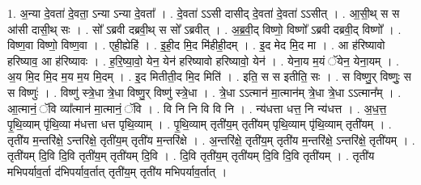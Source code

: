 \documentclass[17pt]{extarticle}
\begin{document}
1. अ॒न्या दे॒वता॑ दे॒वता॒ ऽन्या ऽन्या दे॒वता᳚ । . दे॒वता॑ ऽऽसी दासीद् दे॒वता॑ दे॒वता॑ ऽऽसीत् । . आ॒सी॒थ् स स आ॑सी दासी॒थ् सः । . सो᳚ ऽब्रवी दब्रवी॒थ् स सो᳚ ऽब्रवीत् । . अ॒ब्र॒वी॒द् विष्णो॒ विष्णो᳚ ऽब्रवी दब्रवी॒द् विष्णो᳚ । . विष्ण॒वा विष्णो॒ विष्ण॒वा । . एही॒ह्येहि॑ । . इ॒ही॒द मि॒द मि॑हीही॒दम् । . इ॒द मेद मि॒द मा । . आ ह॑रिष्यावो हरिष्याव॒ आ ह॑रिष्यावः । . ह॒रि॒ष्या॒वो॒ येन॒ येन॑ हरिष्यावो हरिष्यावो॒ येन॑ । . येना॒य म॒यं ॅयेन॒ येना॒यम् । . अ॒य मि॒द मि॒द म॒य म॒य मि॒दम् । . इ॒द मितीती॒द मि॒द मिति॑ । . इति॒ स स इतीति॒ सः । . स विष्णु॒र् विष्णुः॒ स स विष्णुः॑ । . विष्णु॑ स्त्रे॒धा त्रे॒धा विष्णु॒र् विष्णु॑ स्त्रे॒धा । . त्रे॒धा ऽऽत्मान॑ मा॒त्मान॑म् त्रे॒धा त्रे॒धा ऽऽत्मान᳚म् । . आ॒त्मानं॒ ॅवि व्या᳚त्मान॑ मा॒त्मानं॒ ॅवि । . वि नि नि वि वि नि । . न्य॑धत्ता धत्त॒ नि न्य॑धत्त । . अ॒ध॒त्त॒ पृ॒थि॒व्याम् पृ॑थि॒व्या म॑धत्ता धत्त पृथि॒व्याम् । . पृ॒थि॒व्याम् तृती॑य॒म् तृती॑यम् पृथि॒व्याम् पृ॑थि॒व्याम् तृती॑यम् । . तृती॑य म॒न्तरि॑क्षे॒ ऽन्तरि॑क्षे॒ तृती॑य॒म् तृती॑य म॒न्तरि॑क्षे । . अ॒न्तरि॑क्षे॒ तृती॑य॒म् तृती॑य म॒न्तरि॑क्षे॒ ऽन्तरि॑क्षे॒ तृती॑यम् । . तृती॑यम् दि॒वि दि॒वि तृती॑य॒म् तृती॑यम् दि॒वि । . दि॒वि तृती॑य॒म् तृती॑यम् दि॒वि दि॒वि तृती॑यम् । . तृती॑य मभिपर्याव॒र्ता द॑भिपर्याव॒र्तात् तृती॑य॒म् तृती॑य मभिपर्याव॒र्तात् । \newline
\end{document}

